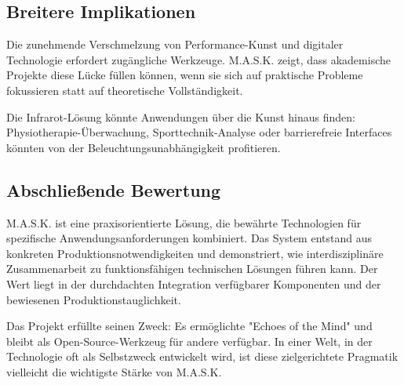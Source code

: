 \subsection{Breitere Implikationen}

Die zunehmende Verschmelzung von Performance-Kunst und digitaler Technologie erfordert zugängliche Werkzeuge. M.A.S.K. zeigt, dass akademische Projekte diese Lücke füllen können, wenn sie sich auf praktische Probleme fokussieren statt auf theoretische Vollständigkeit.

Die Infrarot-Lösung könnte Anwendungen über die Kunst hinaus finden: Physiotherapie-Überwachung, Sporttechnik-Analyse oder barrierefreie Interfaces könnten von der Beleuchtungsunabhängigkeit profitieren.

\subsection{Abschließende Bewertung}

M.A.S.K. ist eine praxisorientierte Lösung, die bewährte Technologien für spezifische Anwendungsanforderungen kombiniert. Das System entstand aus konkreten Produktionsnotwendigkeiten und demonstriert, wie interdisziplinäre Zusammenarbeit zu funktionsfähigen technischen Lösungen führen kann. Der Wert liegt in der durchdachten Integration verfügbarer Komponenten und der bewiesenen Produktionstauglichkeit.

Das Projekt erfüllte seinen Zweck: Es ermöglichte "Echoes of the Mind" und bleibt als Open-Source-Werkzeug für andere verfügbar. In einer Welt, in der Technologie oft als Selbstzweck entwickelt wird, ist diese zielgerichtete Pragmatik vielleicht die wichtigste Stärke von M.A.S.K.